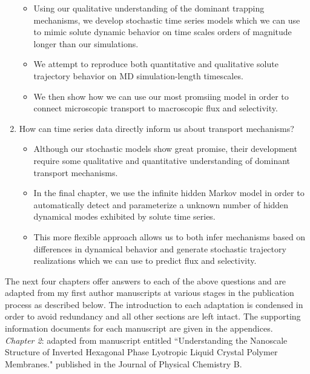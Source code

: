 \begin{enumerate}
    	\begin{itemize}
    	  \item Using our qualitative understanding of the dominant trapping mechanisms,
    	  we develop stochastic time series models which we can use to mimic solute dynamic
    	  behavior on time scales orders of magnitude longer than our simulations. 
    	  \item We attempt to reproduce both quantitative and qualitative solute trajectory
    	  behavior on MD simulation-length timescales.
    	  \item We then show how we can use our most promsiing model in order to connect 
    	  microscopic transport to macroscopic flux and selectivity.
    	\end{itemize}

    \item How can time series data directly inform us about transport mechanisms?
    	\begin{itemize}
    	  \item Although our stochastic models show great promise, their development 
    	  require some qualitative and quantitative understanding of dominant transport
    	  mechanisms.
    	  \item In the final chapter, we use the infinite hidden Markov model in order
    	  to automatically detect and parameterize a unknown number of hidden dynamical modes
    	  exhibited by solute time series. 
    	  \item This more flexible approach allows us to both infer mechanisms based 
    	  on differences in dynamical behavior and generate stochastic trajectory realizations
    	  which we can use to predict flux and selectivity. 
    	\end{itemize}
  \end{enumerate} 
  
  The next four chapters offer answers to each of the above questions and are adapted from 
  my first author manuscripts at various stages in the publication process as described
  below. The introduction to each adaptation is condensed in order to avoid redundancy and 
  all other sections are left intact. The supporting information documents for each manuscript are
  given in the appendices. \\
  

  \noindent\textit{Chapter 2}: adapted from manuscript entitled ``Understanding the 
  Nanoscale Structure of Inverted Hexagonal Phase Lyotropic Liquid Crystal Polymer Membranes." 
  published in the Journal of Physical Chemistry B.~\cite{coscia_understanding_2019} \\

